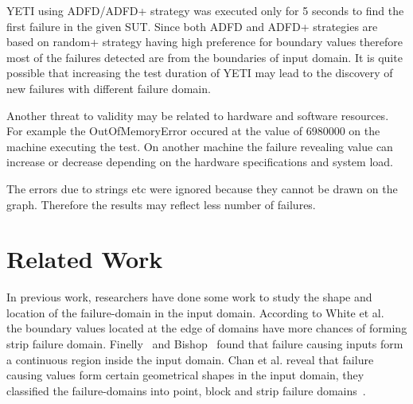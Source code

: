 \documentclass[runningheads,a4paper]{llncs}
\begin{document}
YETI using ADFD/ADFD+ strategy was executed only for 5 seconds to find the first failure in the given SUT. Since both ADFD and ADFD+ strategies are based on random+ strategy having high preference for boundary values therefore most of the failures detected are from the boundaries of input domain. It is quite possible that increasing the test duration of YETI may lead to the discovery of new failures with different failure domain.

Another threat to validity may be related to hardware and software resources. For example the OutOfMemoryError occured at the value of 6980000 on the machine executing the test. On another machine the failure revealing value can increase or decrease depending on the hardware specifications and system load.

The errors due to strings etc were ignored because they cannot be drawn on the graph. Therefore the results may reflect less number of failures.












\section{Related Work}
In previous work, researchers have done some work to study the shape and location of the failure-domain in the input domain. According to White et al.~\cite{white1980domain} the boundary values located at the edge of domains have more chances of forming strip failure domain. Finelly~\cite{finelli1991nasa} and Bishop~\cite{bishop1993variation} found that failure causing inputs form a continuous region inside the input domain. Chan et al. reveal that failure causing values form certain geometrical shapes in the input domain, they classified the failure-domains into point, block and strip failure domains~\cite{chan1996proportional}. 
\end{document}
